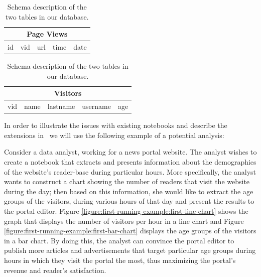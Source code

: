 \begin{table}
\begin{center}

\begin{tabular}{|c|c|c|c|c|}
\hline 
\multicolumn{5}{|c|}{Page Views} \\ 
\hline 
id & vid & url & time & date \\ 
\hline 
\end{tabular} 

\hfill

\begin{tabular}{|c|c|c|c|c|}
\hline 
\multicolumn{5}{|c|}{Visitors} \\ 
\hline 
vid & name & lastname & username & age \\ 
\hline 
\end{tabular} 

\end{center}
\caption{Schema description of the two tables in our database.}
\label{tab:schema}
\end{table}


In order to illustrate the issues with existing notebooks and describe the extensions in \projname\, we will use the following example of a potential analysis:

\begin{example}
Consider a data analyst, working for a news portal website. The analyst wishes to create a notebook that extracts and presents information about the demographics of the website's reader-base during particular hours. More specifically, the analyst wants to construct a chart showing the number of readers that visit the website during the day; then based on this information, she would like to extract the age groups of the visitors, during various hours of that day and present the results to the portal editor. Figure \ref{figure:first-running-example:first-line-chart} shows the graph that displays the number of visitors per hour in a line chart and Figure \ref{figure:first-running-example:first-bar-chart} displays the age groups of the visitors in a bar chart. By doing this, the analyst can convince the portal editor to publish more articles and advertisements that target particular age groups during hours in which they visit the portal the most, thus maximizing the portal's revenue and reader's satisfaction.
\end{example}

